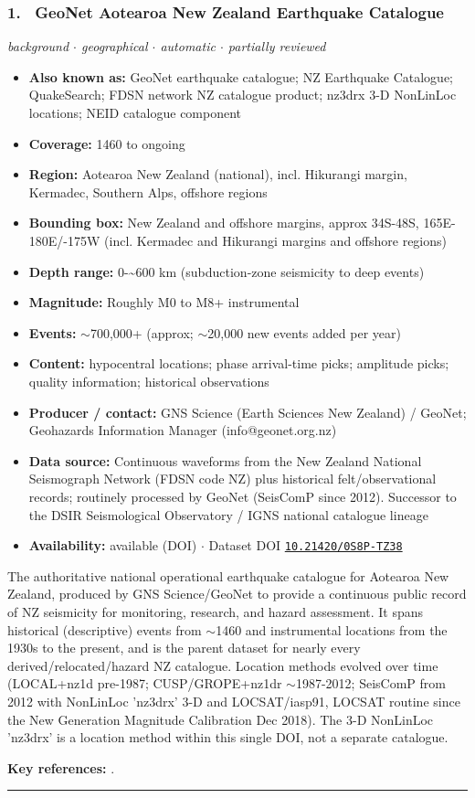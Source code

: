 \documentclass[10pt,a4paper]{article}
\newcommand{\catentryrule}{\par\vspace{3pt}\noindent\textcolor{rulegrey}{\rule{\linewidth}{0.3pt}}\par\vspace{5pt}}
\newcommand{\kv}[2]{\item \textbf{#1:} #2}
\begin{document}
\subsubsection*{\hypertarget{c:1}{1.}~ GeoNet Aotearoa New Zealand Earthquake Catalogue}
{\small\itshape background $\cdot$ geographical $\cdot$ automatic $\cdot$ partially reviewed}\par\vspace{2pt}
\begin{itemize}[leftmargin=1.3em,itemsep=0.6pt,topsep=1pt,parsep=0pt]
\kv{Also known as}{GeoNet earthquake catalogue; NZ Earthquake Catalogue; QuakeSearch; FDSN network NZ catalogue product; nz3drx 3-D NonLinLoc locations; NEID catalogue component}
\kv{Coverage}{1460 to ongoing}
\kv{Region}{Aotearoa New Zealand (national), incl. Hikurangi margin, Kermadec, Southern Alps, offshore regions}
\kv{Bounding box}{New Zealand and offshore margins, approx 34S-48S, 165E-180E/-175W (incl. Kermadec and Hikurangi margins and offshore regions)}
\kv{Depth range}{0-\textasciitilde{}600 km (subduction-zone seismicity to deep events)}
\kv{Magnitude}{Roughly M0 to M8+ instrumental}
\kv{Events}{$\sim$700,000+ (approx; $\sim$20,000 new events added per year)}
\kv{Content}{hypocentral locations; phase arrival-time picks; amplitude picks; quality information; historical observations}
\kv{Producer / contact}{GNS Science (Earth Sciences New Zealand) / GeoNet; Geohazards Information Manager (info@\allowbreak{}geonet.org.nz)}
\kv{Data source}{Continuous waveforms from the New Zealand National Seismograph Network (FDSN code NZ) plus historical felt/observational records; routinely processed by GeoNet (SeisComP since 2012). Successor to the DSIR Seismological Observatory / IGNS national catalogue lineage}
\kv{Availability}{available (DOI) $\cdot$ Dataset DOI \href{https://doi.org/10.21420/0S8P-TZ38}{\nolinkurl{10.21420/0S8P-TZ38}}}
\end{itemize}
\par\vspace{2pt}The authoritative national operational earthquake catalogue for Aotearoa New Zealand, produced by GNS Science/GeoNet to provide a continuous public record of NZ seismicity for monitoring, research, and hazard assessment. It spans historical (descriptive) events from $\sim$1460 and instrumental locations from the 1930s to the present, and is the parent dataset for nearly every derived/relocated/hazard NZ catalogue. Location methods evolved over time (LOCAL+nz1d pre-1987; CUSP/GROPE+nz1dr $\sim$1987-2012; SeisComP from 2012 with NonLinLoc 'nz3drx' 3-D and LOCSAT/iasp91, LOCSAT routine since the New Generation Magnitude Calibration Dec 2018). The 3-D NonLinLoc 'nz3drx' is a location method within this single DOI, not a separate catalogue.
\par\vspace{2pt}\textbf{Key references:} \cite{GNSScience1970,WarrenSmith2024}.
\catentryrule
\end{document}

